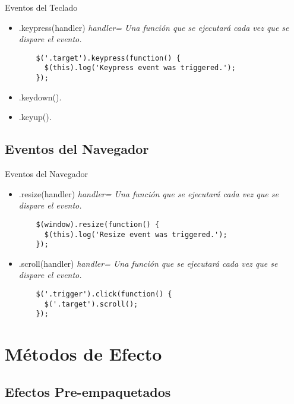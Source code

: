 \begin{frame}[fragile]{Eventos del Teclado} %
\begin{itemize}
    \item .keypress(handler) \textit{ handler= Una función que se ejecutará cada vez que se dispare el evento.}
    \begin{lstlisting}
    $('.target').keypress(function() {
      $(this).log('Keypress event was triggered.');
    });
    \end{lstlisting}
    \item .keydown().
    \item .keyup().
\end{itemize}
\end{frame}

\subsection{Eventos del Navegador} %

\begin{frame}[fragile]{Eventos del Navegador} %
\begin{itemize}
    \item .resize(handler) \textit{ handler= Una función que se ejecutará cada vez que se dispare el evento.}
    \begin{lstlisting}
    $(window).resize(function() {
      $(this).log('Resize event was triggered.');
    });
    \end{lstlisting}
    \item .scroll(handler) \textit{ handler= Una función que se ejecutará cada vez que se dispare el evento.} 
    \begin{lstlisting}
    $('.trigger').click(function() {
      $('.target').scroll();
    });
    \end{lstlisting}
\end{itemize}
\end{frame}

\section{Métodos de Efecto} %

\subsection{Efectos Pre-empaquetados} %

